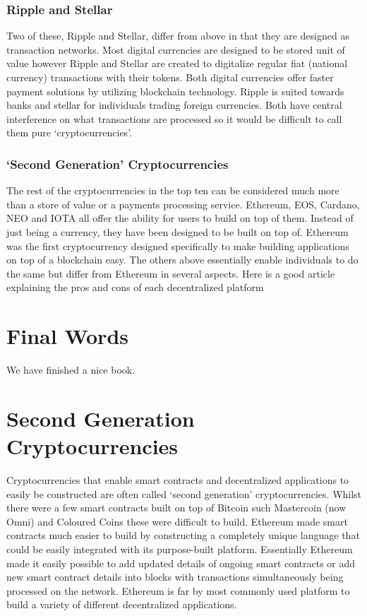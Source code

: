 \documentclass[]{book}
\theoremstyle{definition}
\theoremstyle{definition}
\theoremstyle{definition}
\theoremstyle{remark}
\begin{document}
\subsection{Ripple and Stellar}\label{ripple-and-stellar}

Two of these, Ripple and Stellar, differ from above in that they are
designed as transaction networks. Most digital currencies are designed
to be stored unit of value however Ripple and Stellar are created to
digitalize regular fiat (national currency) transactions with their
tokens. Both digital currencies offer faster payment solutions by
utilizing blockchain technology. Ripple is suited towards banks and
stellar for individuals trading foreign currencies. Both have central
interference on what transactions are processed so it would be difficult
to call them pure `cryptocurrencies'.

\subsection{\texorpdfstring{`Second Generation'
Cryptocurrencies}{Second Generation Cryptocurrencies}}\label{second-generation-cryptocurrencies}

The rest of the cryptocurrencies in the top ten can be considered much
more than a store of value or a payments processing service. Ethereum,
EOS, Cardano, NEO and IOTA all offer the ability for users to build on
top of them. Instead of just being a currency, they have been designed
to be built on top of. Ethereum was the first cryptocurrency designed
specifically to make building applications on top of a blockchain easy.
The others above essentially enable individuals to do the same but
differ from Ethereum in several aspects. Here is a good article
explaining the pros and cons of each decentralized platform

\chapter{Final Words}\label{final-words}

We have finished a nice book.

\chapter{Second Generation
Cryptocurrencies}\label{second-generation-cryptocurrencies-1}

Cryptocurrencies that enable smart contracts and decentralized
applications to easily be constructed are often called `second
generation' cryptocurrencies. Whilst there were a few smart contracts
built on top of Bitcoin such Mastercoin (now Omni) and Coloured Coins
these were difficult to build. Ethereum made smart contracts much easier
to build by constructing a completely unique language that could be
easily integrated with its purpose-built platform. Essentially Ethereum
made it easily possible to add updated details of ongoing smart
contracts or add new smart contract details into blocks with
transactions simultaneously being processed on the network. Ethereum is
far by most commonly used platform to build a variety of different
decentralized applications.
\end{document}
